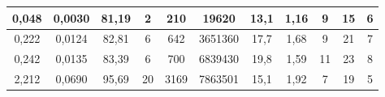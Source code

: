 \begin{sidewaystable}[]
\begin{tabular}{|c|c|c|c|c|c|c|c|c|c|c|}
    0,048                                                                   & 0,0030                                                                 & 81,19                                                                & 2                                                               & 210                                                             & 19620                                                           & 13,1                                                                    & 1,16                                                                 & 9                                                                     & 15                                                                    & 6                                                              \\ \hline
    0,222                                                                   & 0,0124                                                                 & 82,81                                                                & 6                                                               & 642                                                             & 3651360                                                         & 17,7                                                                    & 1,68                                                                 & 9                                                                     & 21                                                                    & 7                                                              \\ \hline
    0,242                                                                   & 0,0135                                                                 & 83,39                                                                & 6                                                               & 700                                                             & 6839430                                                         & 19,8                                                                    & 1,59                                                                 & 11                                                                    & 23                                                                    & 8                                                              \\ \hline
    2,212                                                                   & 0,0690                                                                 & 95,69                                                                & 20                                                              & 3169                                                            & 7863501                                                         & 15,1                                                                    & 1,92                                                                 & 7                                                                     & 19                                                                    & 5                                                              \\ \hline

\end{tabular}
\end{sidewaystable}
